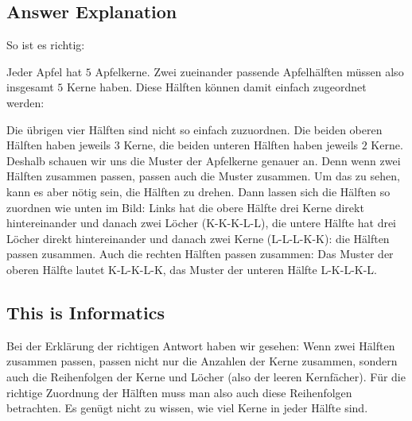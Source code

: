 \documentclass[a4paper,11pt]{report}
\newcommand{\taskGraphicsFolder}{..}
\begin{document}
\endgroup

\subsection*{Answer Explanation}

So ist es richtig:

{\centering%
\par}

Jeder Apfel hat $5$ Apfelkerne. Zwei zueinander passende Apfelhälften müssen also insgesamt $5$ Kerne haben. Diese Hälften können damit einfach zugeordnet werden:

{\centering%
\par}

Die übrigen vier Hälften sind nicht so einfach zuzuordnen. Die beiden oberen Hälften haben jeweils $3$ Kerne, die beiden unteren Hälften haben jeweils $2$ Kerne.  Deshalb schauen wir uns die Muster der Apfelkerne genauer an.  Denn wenn zwei Hälften zusammen passen, passen auch die Muster zusammen.  Um das zu sehen, kann es aber nötig sein, die Hälften zu drehen.  Dann lassen sich die Hälften so zuordnen wie unten im Bild:  Links hat die obere Hälfte drei Kerne direkt hintereinander und danach zwei Löcher (K-K-K-L-L), die untere Hälfte hat drei Löcher direkt hintereinander und danach zwei Kerne (L-L-L-K-K): die Hälften passen zusammen.  Auch die rechten Hälften passen zusammen:  Das Muster der oberen Hälfte lautet K-L-K-L-K, das Muster der unteren Hälfte L-K-L-K-L.

{\centering%
\par}


\subsection*{This is Informatics}

Bei der Erklärung der richtigen Antwort haben wir gesehen:  Wenn zwei Hälften zusammen passen, passen nicht nur die Anzahlen der Kerne zusammen, sondern auch die Reihenfolgen der Kerne und Löcher (also der leeren Kernfächer).  Für die richtige Zuordnung der Hälften muss man also auch diese Reihenfolgen betrachten.  Es genügt nicht zu wissen, wie viel Kerne in jeder Hälfte sind.
\end{document}

